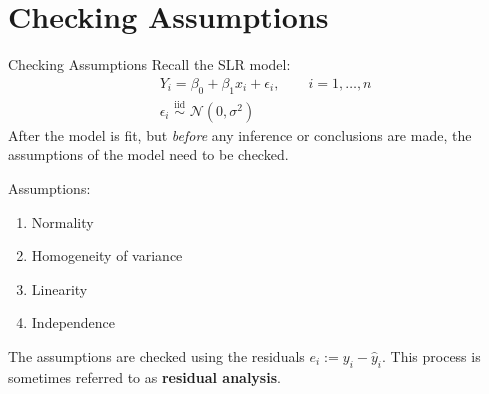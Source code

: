 \documentclass{beamer}
\begin{document}
\section{Checking Assumptions}
\begin{frame}{Checking Assumptions}
Recall the SLR model:
\begin{align*}
&Y_i=\beta_0+\beta_1 x_i+\epsilon_i,\qquad i=1,\ldots,n\\
&\epsilon_i\,\,{\stackrel{\text{iid}}{\sim}}\,\,\mathcal{N}(0,\sigma^2)
\end{align*}
\pause After the model is fit, but \textit{before} any inference or conclusions are made, the assumptions of the model need to be checked.

\vspace{10pt}
\pause Assumptions:
\begin{enumerate}
    \item\pause Normality
    \item\pause Homogeneity of variance
    \item\pause Linearity
    \item\pause Independence
\end{enumerate}
\vspace{10pt}
\pause The assumptions are checked using the residuals $e_i:=y_i-\hat{y}_i$. This process is sometimes referred to as \textbf{residual analysis}.
\end{frame}
\end{document}
